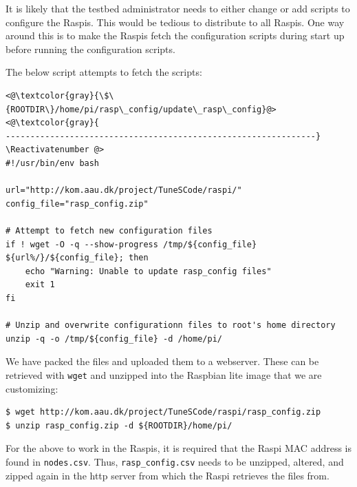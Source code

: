It is likely that the testbed administrator needs to either change or add
scripts to configure the \ac{Raspi}s. This would be tedious to distribute to
all \ac{Raspi}s. One way around this is to make the \ac{Raspi}s fetch the
configuration scripts during start up before running the configuration scripts.

The below script attempts to fetch the scripts:

\Suppressnumber\begin{lstlisting}[]
<@\textcolor{gray}{\$\{ROOTDIR\}/home/pi/rasp\_config/update\_rasp\_config}@>
<@\textcolor{gray}{
---------------------------------------------------------------}
\Reactivatenumber @>
#!/usr/bin/env bash

url="http://kom.aau.dk/project/TuneSCode/raspi/"
config_file="rasp_config.zip"

# Attempt to fetch new configuration files
if ! wget -O -q --show-progress /tmp/${config_file} ${url%/}/${config_file}; then
    echo "Warning: Unable to update rasp_config files"
    exit 1
fi

# Unzip and overwrite configurationn files to root's home directory
unzip -q -o /tmp/${config_file} -d /home/pi/
\end{lstlisting}
\FloatBarrier
\vspace{-5mm}


We have packed the files and uploaded them to a webserver. These can be
retrieved with \texttt{wget} and unzipped into the Raspbian lite image that
we are customizing:

\begin{lstlisting}[]
$ wget http://kom.aau.dk/project/TuneSCode/raspi/rasp_config.zip
$ unzip rasp_config.zip -d ${ROOTDIR}/home/pi/
\end{lstlisting}
\FloatBarrier
\vspace{-5mm}

For the above to work in the \ac{Raspi}s, it is required that the \ac{Raspi}
\ac{MAC} address is found in \texttt{nodes.csv}. Thus,
\texttt{rasp\_config.csv} needs to be unzipped, altered, and zipped again in
the http server from which the \ac{Raspi} retrieves the files from.


